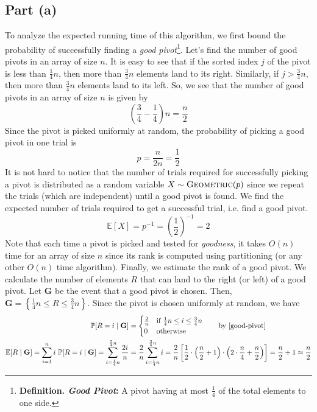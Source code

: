 \documentclass[9pt]{article}
\begin{document}
\subsection*{Part (a)}
To analyze the expected running time of this algorithm, we first bound the probability of
successfully finding a \textit{good pivot}\footnote{\textbf{Definition. \textit{Good Pivot}:} A pivot
having at most $\frac{1}{4}$ of the total elements to one side.}. Let's find the number of good pivots
in an array of size $n$. It is easy to see that if the sorted index $j$ of the pivot is less than
$\frac{1}{4} n$, then more than $\frac{3}{4} n$ elements land to its right. Similarly, if $j > \frac{3}{4} n$,
then more than $\frac{3}{4} n$ elements land to its left. So, we see that the number of good pivots
in an array of size $n$ is given by
\begin{equation}
    \label{good-pivot}
    \left( \frac{3}{4} - \frac{1}{4} \right) n = \frac{n}{2}
\end{equation}
Since the pivot is picked uniformly at random, the probability of picking a good pivot in one trial
is
\begin{equation}
    \label{prob-good-pivot}
    p = \frac{n}{2n} = \frac{1}{2}
\end{equation}
It is not hard to notice that the number of trials required for successfully picking a pivot is
distributed as a random variable $X \sim \Call{Geometric}{p}$ since we repeat the trials (which are
independent) until a good pivot is found. We find the expected number of trials required to get a
successful trial, i.e. find a good pivot.
\begin{equation}
    \label{exp-X}
    \mathbb{E}[X] = p^{-1} = \left(\frac{1}{2} \right)^{-1} = 2
\end{equation}
Note that each time a pivot is picked and tested for \textit{goodness}, it takes $O(n)$ time for
an array of size $n$ since its rank is computed using partitioning (or any other $O(n)$ time algorithm).
Finally, we estimate the rank of a good pivot. We calculate the number of elements $R$ that can land
to the right (or left) of a good pivot. Let $\textbf{G}$ be the event that a good pivot is chosen.
Then, $\textbf{G} = \left\{ \frac{1}{4} n \leq R \leq \frac{3}{4} n \right\}$. Since the pivot is
chosen uniformly at random, we have
\begin{align}
    \label{R2}
    \mathbb{P}[R = i \mid \textbf{G}] &= \begin{cases}
        \frac{2}{n} & \text{if } \frac{1}{4}n \leq i \leq \frac{3}{4}n \\
        0 & \text{otherwise}
    \end{cases} \qquad \text{by \eqref{good-pivot}}\\
    \label{exp-R2}
    \mathbb{E}[R \mid \textbf{G}] = \sum_{i=1}^{n} i \ \mathbb{P}[R = i \mid \textbf{G}]
    = \sum_{i=\frac{1}{4}n}^{\frac{3}{4}n} \frac{2i}{n}
    &= \frac{2}{n} \sum_{i=\frac{1}{4}n}^{\frac{3}{4}n} i
    = \frac{2}{n} \left[ \frac{1}{2} \cdot \left( \frac{n}{2} + 1 \right) \cdot \left( 2 \cdot \frac{n}{4} + \frac{n}{2} \right) \right]
    = \frac{n}{2} + 1 \approx \frac{n}{2}
\end{align}
\end{document}

